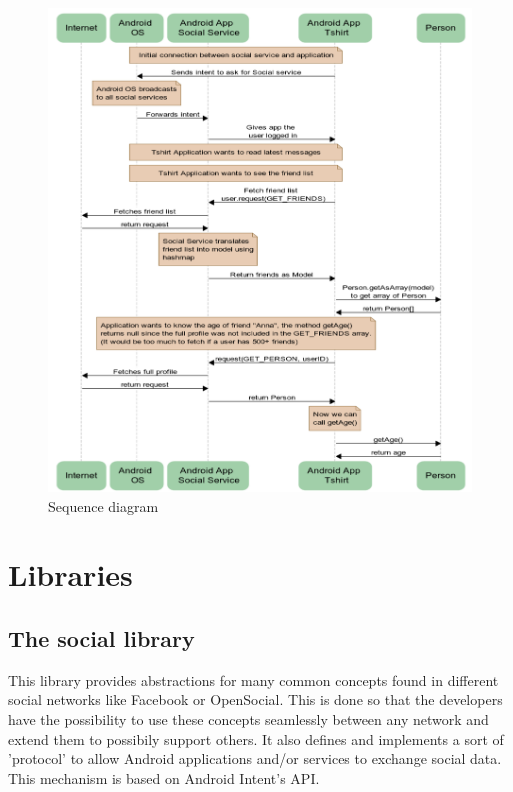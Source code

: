 \begin{figure}[h!]
	\centering \includegraphics[width=1.0\textwidth]{img/design-sequence.png}
	\caption{Sequence diagram}
	\label{fig:design-sequence}
\end{figure}



\section{Libraries}

\subsection{The social library}
This library provides abstractions for many common concepts found in different
social networks like Facebook or OpenSocial. This is done so that the developers have the possibility
to use these concepts seamlessly between any network and extend them to possibily support others.
It also defines and implements a sort of 'protocol' to allow Android applications and/or services
to exchange social data. This mechanism is based on Android Intent's API.

